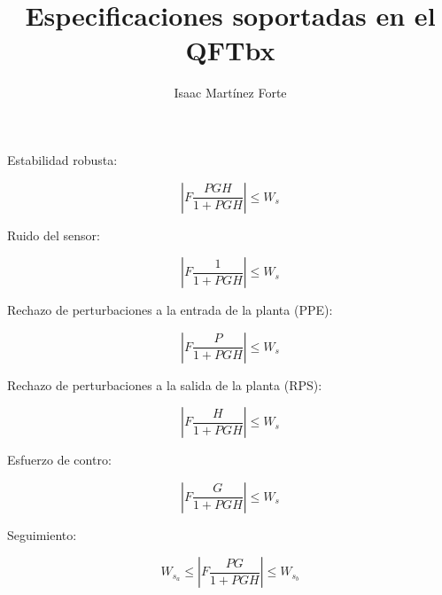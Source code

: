 \documentclass[a4paper,10pt]{article}
\title{Especificaciones soportadas en el QFTbx}
\author{Isaac Martínez Forte}
\begin{document}
\maketitle

Estabilidad robusta:

 
 $$\left| F\frac{PGH}{1+PGH} \right| \leq W_s$$
 

 Ruido del sensor:
 
 $$\left| F\frac{1}{1+PGH} \right| \leq W_s$$

 Rechazo de perturbaciones a la entrada de la planta (PPE):
 
 $$\left| F\frac{P}{1+PGH} \right| \leq W_s$$
 
 Rechazo de perturbaciones a la salida de la planta (RPS):
 
 $$\left| F\frac{H}{1+PGH} \right| \leq W_s$$
 
 Esfuerzo de contro:
 
 $$\left| F\frac{G}{1+PGH} \right| \leq W_s$$
 
 Seguimiento:
 
 $$W_{s_{a}}\leq \left| F\frac{PG}{1+PGH} \right| \leq W_{s_{b}}$$
\end{document}
